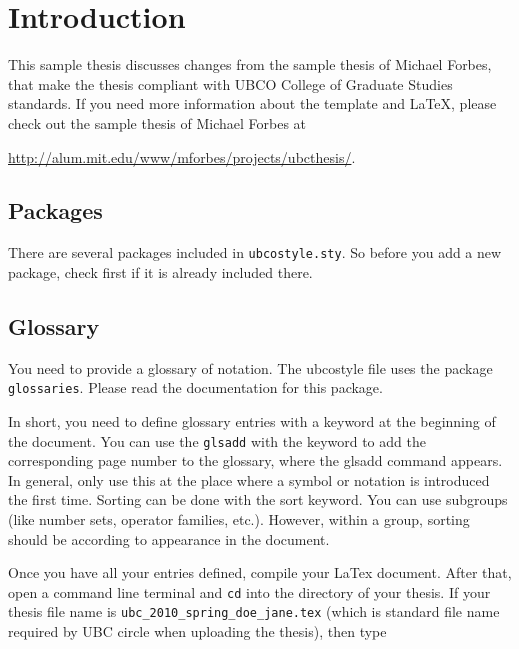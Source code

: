\documentclass[msc,oneside]{ubcthesis}%
\begin{document}
\mainmatter


\chapter{Introduction}
This sample thesis discusses changes from the sample thesis of Michael Forbes, that make the thesis compliant with UBCO College of Graduate Studies standards. If you need more information about the template and LaTeX, please check out the sample thesis of Michael Forbes at

\href{http://alum.mit.edu/www/mforbes/projects/ubcthesis/}{http://alum.mit.edu/www/mforbes/projects/ubcthesis/}.

\cite{MR2848848,MR2461448,MR2834159,infconv,convmono,MR2668638,Bauschke:2007-PA02,proxbas}

\section{Packages}
There are several packages included in \texttt{ubcostyle.sty}. So before you add a new package, check first if it is already included there.

\section{Glossary}
You need to provide a glossary of notation. The ubcostyle file uses the package \texttt{glossaries}. Please read the documentation for this package.

In short, you need to define glossary entries with a keyword at the beginning of the document. You can use the \texttt{glsadd} with the keyword to add the corresponding page number to the glossary, where the glsadd command appears. In general, only use this at the place where a symbol or notation is introduced the first time. Sorting can be done with the sort keyword. You can use subgroups (like number sets, operator families, etc.). However, within a group, sorting should be according to appearance in the document.

Once you have all your entries defined, compile your LaTex document. After that, open a command line terminal and \texttt{cd} into the directory of your thesis. If your thesis file name is \texttt{ubc\_2010\_spring\_doe\_jane.tex} (which is standard file name required by UBC circle when uploading the thesis), then type
\end{document}

